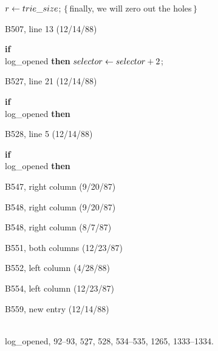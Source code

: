 \ninepoint\noindent\kern10pt
$r\gets\\{trie\_size}$;\quad
$\{\,$finally, we will zero out the holes$\,\}$

\bugonpage B507, line 13 (12/14/88)

\ninepoint\noindent\kern10pt
{\bf if\/} \\{log\_opened} {\bf then} $\\{selector}\gets\\{selector}+2$;

\bugonpage B527, line 21 (12/14/88)

\ninepoint\noindent\kern10pt
{\bf if\/} \\{log\_opened} {\bf then}

\bugonpage B528, line 5 (12/14/88)

\ninepoint\noindent\kern10pt
{\bf if\/} \\{log\_opened} {\bf then}

\bugonpage B547, right column (9/20/87)

\eightpoint
{}

\bugonpage B548, right column (9/20/87)

\eightpoint
{}

\bugonpage B548, right column (8/7/87)

\eightpoint
{}

\bugonpage B551, both columns (12/23/87)


\bugonpage B552, left column (4/28/88)


\bugonpage B554, left column (12/23/87)


\bugonpage B559, new entry (12/14/88)

\eightpoint\noindent
\\{log\_opened}, 92--93, $\underline{527}$, 528, 534--535, 1265, 1333--1334.

